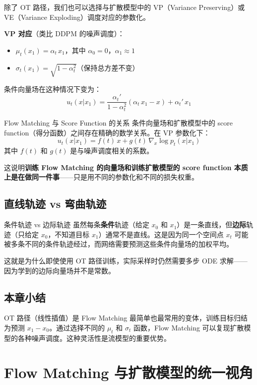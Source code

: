 \documentclass[a4paper]{article}
\begin{document}
除了 OT 路径，我们也可以选择与扩散模型中的 VP（Variance Preserving）或 VE（Variance Exploding）调度对应的参数化。

\textbf{VP 对应}（类比 DDPM 的噪声调度）：
\begin{itemize}
    \item $\mu_t(x_1) = \alpha_t \, x_1$，其中 $\alpha_0 = 0$，$\alpha_1 \approx 1$
    \item $\sigma_t(x_1) = \sqrt{1 - \alpha_t^2}$（保持总方差不变）
\end{itemize}

条件向量场在这种情况下变为：
$$u_t(x | x_1) = \frac{\alpha_t'}{1 - \alpha_t^2} \left( \alpha_t \, x_1 - x \right) + \alpha_t' \, x_1$$

\begin{knowledgebox}{Flow Matching 与 Score Function 的关系}
条件向量场和扩散模型中的 score function（得分函数）之间存在精确的数学关系。在 VP 参数化下：
$$u_t(x | x_1) = f(t) \, x + g(t) \, \nabla_x \log p_t(x | x_1)$$
其中 $f(t)$ 和 $g(t)$ 是与噪声调度相关的系数。

这说明\textbf{训练 Flow Matching 的向量场和训练扩散模型的 score function 本质上是在做同一件事}——只是用不同的参数化和不同的损失权重。
\end{knowledgebox}

\subsection{直线轨迹 vs 弯曲轨迹}

\begin{warningbox}{条件轨迹 vs 边际轨迹}
虽然每条\textbf{条件}轨迹（给定 $x_0$ 和 $x_1$）是一条直线，但\textbf{边际}轨迹（只给定 $x_0$，不知道目标 $x_1$）通常不是直线。这是因为同一个空间点 $x_t$ 可能被多条不同的条件轨迹经过，而网络需要预测这些条件向量场的加权平均。

这就是为什么即使使用 OT 路径训练，实际采样时仍然需要多步 ODE 求解——因为学到的边际向量场并不是常数。
\end{warningbox}

\subsection{本章小结}

OT 路径（线性插值）是 Flow Matching 最简单也最常用的变体，训练目标归结为预测 $x_1 - x_0$。通过选择不同的 $\mu_t$ 和 $\sigma_t$ 函数，Flow Matching 可以复现扩散模型的各种噪声调度。这种灵活性是流模型的重要优势。


\section{Flow Matching 与扩散模型的统一视角}
\end{document}

